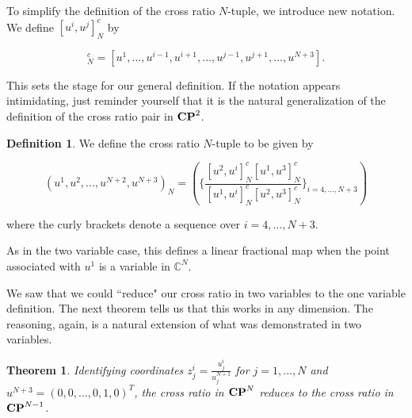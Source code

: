 \documentclass{amsart}
\theoremstyle{theorem}
\newtheorem{theorem}{Theorem}
\theoremstyle{lemma}
\theoremstyle{definition}
\newtheorem*{definition}{Definition}
\begin{document}
To simplify the definition of the cross ratio $N$-tuple, we introduce new notation. We define $[u^i, u^j]_N^c$ by

\begin{equation*}[u^i, u^j]_N^c=[u^1,...,u^{i-1},u^{i+1},..., u^{j-1}, u^{j+1},..., u^{N+3}].
\end{equation*}

This sets the stage for our general definition. If the notation appears intimidating, just reminder yourself that it is the natural generalization of the definition of the cross ratio pair in ${\bf CP}^2$.

\begin{definition} 

We define the cross ratio $N$-tuple to be given by

$$(u^1, u^2,..., u^{N+2}, u^{N+3})_N=\left( \bigg\{\frac{[u^2, u^i]_N^c[u^1, u^3]_N^c}{[u^1, u^i]_N^c[u^2, u^3]_N^c}\bigg\}_{i=4,...,N+3}\right)$$

\noindent where the curly brackets denote a sequence over $i=4,...,N+3$.

\end{definition}

As in the two variable case, this defines a linear fractional map when the point associated with $u^1$ is a variable in $\mathbb{C}^N$.

We saw that we could ``reduce" our cross ratio in two variables to the one variable definition. The next theorem tells us that this works in any dimension. The reasoning, again, is a natural extension of what was demonstrated in two variables.

\begin{theorem}
Identifying coordinates $z^i_j=\frac{u^i_j}{u^{N+1}_j}$ for $j=1,...,N$ and $u^{N+3}=(0,0,...,0,1,0)^T$, the cross ratio in ${\bf CP}^N$ reduces to the cross ratio in ${\bf CP}^{N-1}$.
\end{theorem}
\end{document}
